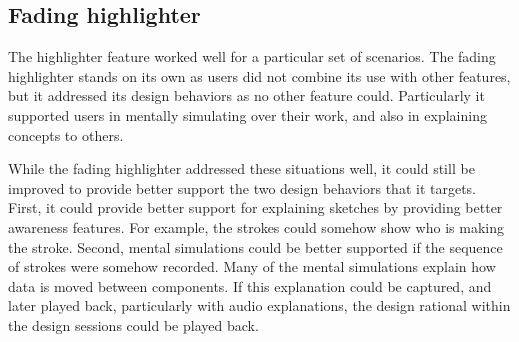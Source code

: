 %

\subsection{Fading highlighter}

	
The highlighter feature worked well for a particular set of scenarios. The fading highlighter stands on its own as users did not combine its use with other features, but it addressed its design behaviors as no other feature could. Particularly it supported users in mentally simulating over their work, and also in explaining concepts to others. 

While the fading highlighter addressed these situations well, it could still be improved to provide better support the two design behaviors that it targets. First, it could provide better support for explaining sketches by providing better awareness features. For example, the strokes could somehow show who is making the stroke. Second, mental simulations could be better supported if the sequence of strokes were somehow recorded. Many of the mental simulations explain how data is moved between components. If this explanation could be captured, and later played back, particularly with audio explanations, the design rational within the design sessions could be played back.


